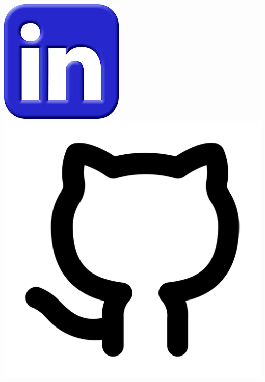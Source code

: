 \documentclass[]{mdkrause_cv_openfont}
\begin{document}
\begin{minipage}[t]{1\textwidth}
\sectionsep


\sectionsep


\hspace{6 cm} \href{https://www.linkedin.com/in/matheus-dalsente-krause-3012b158/}{\includegraphics[scale=0.125]{./logos/lin.jpeg}} \hspace{2 cm}  \href{https://mdkrause.github.io//}{\includegraphics[scale=0.06]{./logos/github.png}}\hspace{2 cm}

\end{minipage}
\end{document}
